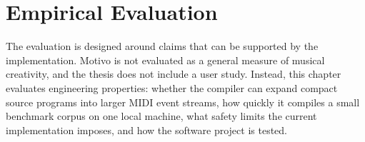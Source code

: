 \chapter{Empirical Evaluation}\label{ch:evaluation}

The evaluation is designed around claims that can be supported by the implementation.
Motivo is not evaluated as a general measure of musical creativity, and the thesis does not include a user study.
Instead, this chapter evaluates engineering properties: whether the compiler can expand compact source programs into
larger MIDI event streams, how quickly it compiles a small benchmark corpus on one local machine, what safety limits the
current implementation imposes, and how the software project is tested.








